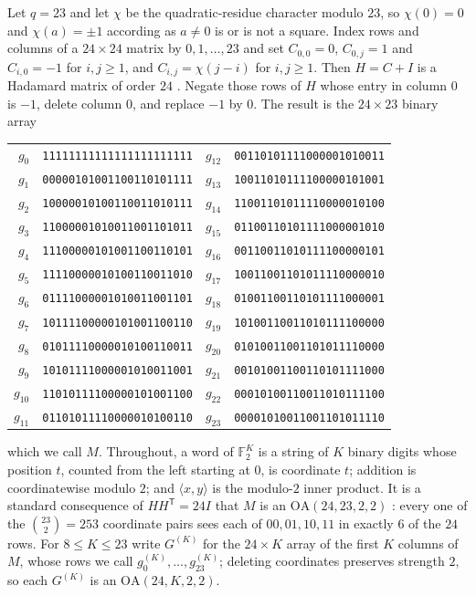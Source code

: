 \documentclass[11pt]{amsart}
\newcommand{\OA}{\mathrm{OA}}
\newcommand{\FF}{\mathbb{F}_2}
\begin{document}
Let $q=23$ and let $\chi$ be the quadratic-residue character modulo $23$, so $\chi(0)=0$ and
$\chi(a)=\pm1$ according as $a\ne0$ is or is not a square. Index rows and columns of a
$24\times24$ matrix by $0,1,\dots,23$ and set $C_{0,0}=0$, $C_{0,j}=1$ and $C_{i,0}=-1$ for
$i,j\ge1$, and $C_{i,j}=\chi(j-i)$ for $i,j\ge1$. Then $H=C+I$ is a Hadamard matrix of order $24$
\cite{Paley1933}. Negate those rows of $H$ whose entry in column $0$ is $-1$, delete column $0$,
and replace $-1$ by $0$. The result is the $24\times23$ binary array
\begin{center}
\small
\begin{tabular}{r@{\quad}l@{\qquad}r@{\quad}l}
$g_{0}$&\texttt{11111111111111111111111}&$g_{12}$&\texttt{00110101111000001010011}\\
$g_{1}$&\texttt{00000101001100110101111}&$g_{13}$&\texttt{10011010111100000101001}\\
$g_{2}$&\texttt{10000010100110011010111}&$g_{14}$&\texttt{11001101011110000010100}\\
$g_{3}$&\texttt{11000001010011001101011}&$g_{15}$&\texttt{01100110101111000001010}\\
$g_{4}$&\texttt{11100000101001100110101}&$g_{16}$&\texttt{00110011010111100000101}\\
$g_{5}$&\texttt{11110000010100110011010}&$g_{17}$&\texttt{10011001101011110000010}\\
$g_{6}$&\texttt{01111000001010011001101}&$g_{18}$&\texttt{01001100110101111000001}\\
$g_{7}$&\texttt{10111100000101001100110}&$g_{19}$&\texttt{10100110011010111100000}\\
$g_{8}$&\texttt{01011110000010100110011}&$g_{20}$&\texttt{01010011001101011110000}\\
$g_{9}$&\texttt{10101111000001010011001}&$g_{21}$&\texttt{00101001100110101111000}\\
$g_{10}$&\texttt{11010111100000101001100}&$g_{22}$&\texttt{00010100110011010111100}\\
$g_{11}$&\texttt{01101011110000010100110}&$g_{23}$&\texttt{00001010011001101011110}\\
\end{tabular}
\end{center}
which we call $M$. Throughout, a word of $\FF^K$ is a string of $K$ binary digits whose
position $t$, counted from the left starting at $0$, is coordinate $t$; addition is coordinatewise
modulo $2$; and $\langle x,y\rangle$ is the modulo-$2$ inner product. It is a standard consequence
of $HH^{\mathsf T}=24I$ that $M$ is an $\OA(24,23,2,2)$ \cite[p.~148]{HSS1999}: every one of the
$\binom{23}{2}=253$ coordinate pairs sees each of $00,01,10,11$ in exactly $6$ of the $24$ rows.
For $8\le K\le23$ write $G^{(K)}$ for the $24\times K$ array of the first $K$ columns of $M$, whose
rows we call $g^{(K)}_0,\dots,g^{(K)}_{23}$; deleting coordinates preserves strength $2$, so each
$G^{(K)}$ is an $\OA(24,K,2,2)$.
\end{document}
